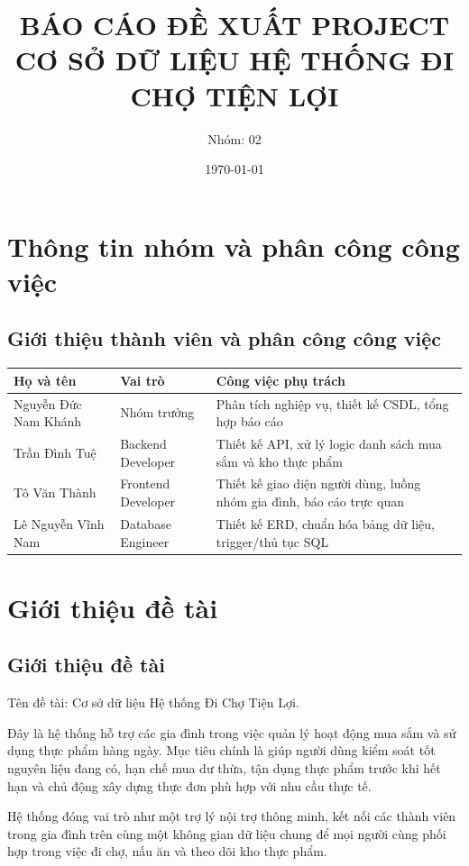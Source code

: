 \documentclass[12pt,a4paper]{report}
\title{\textbf{BÁO CÁO ĐỀ XUẤT PROJECT}\\[4pt]
\Large CƠ SỞ DỮ LIỆU HỆ THỐNG ĐI CHỢ TIỆN LỢI}
\author{Nhóm: 02}
\date{\today}
\begin{document}
\maketitle
{}
\tableofcontents
\newpage
{}
\newpage

\chapter{Thông tin nhóm và phân công công việc}
\section{Giới thiệu thành viên và phân công công việc}
\begin{longtable}{|p{3cm}|p{4cm}|p{7cm}|}
\hline
\textbf{Họ và tên} & \textbf{Vai trò} & \textbf{Công việc phụ trách} \\
\hline
Nguyễn Đức Nam Khánh & Nhóm trưởng & Phân tích nghiệp vụ, thiết kế CSDL, tổng hợp báo cáo \\
\hline
Trần Đình Tuệ & Backend Developer & Thiết kế API, xử lý logic danh sách mua sắm và kho thực phẩm \\
\hline
Tô Văn Thành & Frontend Developer & Thiết kế giao diện người dùng, luồng nhóm gia đình, báo cáo trực quan \\
\hline
Lê Nguyễn Vĩnh Nam & Database Engineer & Thiết kế ERD, chuẩn hóa bảng dữ liệu, trigger/thủ tục SQL \\
\hline
\end{longtable}

\chapter{Giới thiệu đề tài}


\section{Giới thiệu đề tài}
Tên đề tài: Cơ sở dữ liệu Hệ thống Đi Chợ Tiện Lợi.  

Đây là hệ thống hỗ trợ các gia đình trong việc quản lý hoạt động mua sắm và sử dụng thực phẩm hàng ngày. Mục tiêu chính là giúp người dùng kiểm soát tốt nguyên liệu đang có, hạn chế mua dư thừa, tận dụng thực phẩm trước khi hết hạn và chủ động xây dựng thực đơn phù hợp với nhu cầu thực tế.  

Hệ thống đóng vai trò như một trợ lý nội trợ thông minh, kết nối các thành viên trong gia đình trên cùng một không gian dữ liệu chung để mọi người cùng phối hợp trong việc đi chợ, nấu ăn và theo dõi kho thực phẩm.  
\end{document}
